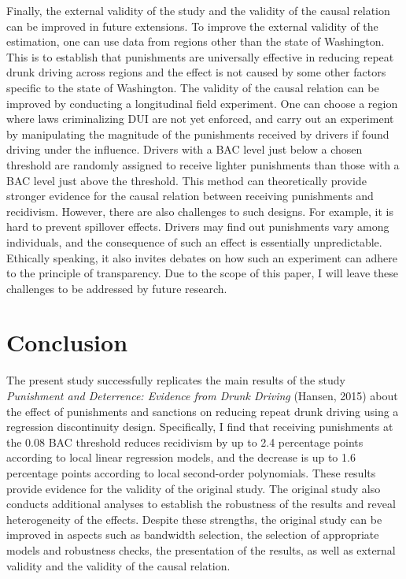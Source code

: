 \documentclass[
  11pt,
]{article}
\begin{document}
Finally, the external validity of the study and the validity of the
causal relation can be improved in future extensions. To improve the
external validity of the estimation, one can use data from regions other
than the state of Washington. This is to establish that punishments are
universally effective in reducing repeat drunk driving across regions
and the effect is not caused by some other factors specific to the state
of Washington. The validity of the causal relation can be improved by
conducting a longitudinal field experiment. One can choose a region
where laws criminalizing DUI are not yet enforced, and carry out an
experiment by manipulating the magnitude of the punishments received by
drivers if found driving under the influence. Drivers with a BAC level
just below a chosen threshold are randomly assigned to receive lighter
punishments than those with a BAC level just above the threshold. This
method can theoretically provide stronger evidence for the causal
relation between receiving punishments and recidivism. However, there
are also challenges to such designs. For example, it is hard to prevent
spillover effects. Drivers may find out punishments vary among
individuals, and the consequence of such an effect is essentially
unpredictable. Ethically speaking, it also invites debates on how such
an experiment can adhere to the principle of transparency. Due to the
scope of this paper, I will leave these challenges to be addressed by
future research.

\hypertarget{conclusion}{%
\section{Conclusion}\label{conclusion}}

The present study successfully replicates the main results of the study
\emph{Punishment and Deterrence: Evidence from Drunk Driving} (Hansen,
2015) about the effect of punishments and sanctions on reducing repeat
drunk driving using a regression discontinuity design. Specifically, I
find that receiving punishments at the 0.08 BAC threshold reduces
recidivism by up to 2.4 percentage points according to local linear
regression models, and the decrease is up to 1.6 percentage points
according to local second-order polynomials. These results provide
evidence for the validity of the original study. The original study also
conducts additional analyses to establish the robustness of the results
and reveal heterogeneity of the effects. Despite these strengths, the
original study can be improved in aspects such as bandwidth selection,
the selection of appropriate models and robustness checks, the
presentation of the results, as well as external validity and the
validity of the causal relation.
\end{document}
